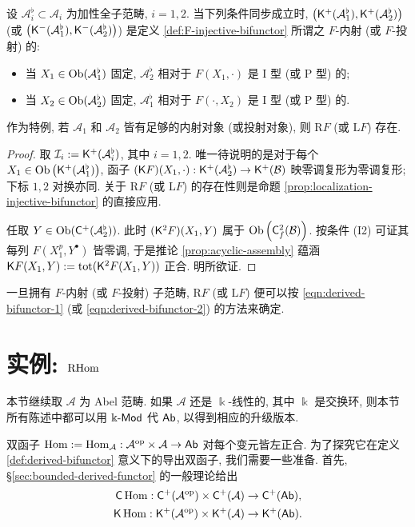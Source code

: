 \begin{lemma}\label{prop:RF-bifunctor}
	设 $\mathcal{A}_i^\flat \subset \mathcal{A}_i$ 为加性全子范畴, $i = 1, 2$. 当下列条件同步成立时, $\left(\mathsf{K}^+(\mathcal{A}_1^\flat), \mathsf{K}^+(\mathcal{A}_2^\flat) \right)$ (或 $\left(\mathsf{K}^-(\mathcal{A}_1^\flat), \mathsf{K}^-(\mathcal{A}_2^\flat) \right)$) 是定义 \ref{def:F-injective-bifunctor} 所谓之 $F$-内射 (或 $F$-投射) 的:
	\begin{itemize}
		\item 当 $X_1 \in \operatorname{Ob}(\mathcal{A}_1^\flat)$ 固定, $\mathcal{A}_2^\flat$ 相对于 $F(X_1, \cdot)$ 是 I 型 (或 P 型) 的;
		\item 当 $X_2 \in \operatorname{Ob}(\mathcal{A}_2^\flat)$ 固定, $\mathcal{A}_1^\flat$ 相对于 $F(\cdot, X_2)$ 是 I 型 (或 P 型) 的.
	\end{itemize}
	作为特例, 若 $\mathcal{A}_1$ 和 $\mathcal{A}_2$ 皆有足够的内射对象 (或投射对象), 则 $\mathrm{R}F$ (或 $\mathrm{L}F$) 存在.
\end{lemma}
\begin{proof}
	取 $\mathcal{I}_i := \mathsf{K}^+(\mathcal{A}_i^\flat)$, 其中 $i=1,2$. 唯一待说明的是对于每个 $X_1 \in \operatorname{Ob}\left(\mathsf{K}^+(\mathcal{A}^\flat_1)\right)$, 函子 $(\mathsf{K}F)(X_1, \cdot): \mathsf{K}^+(\mathcal{A}^\flat_2) \to \mathsf{K}^+(\mathcal{B})$ 映零调复形为零调复形; 下标 $1, 2$ 对换亦同. 关于 $\mathrm{R}F$ (或 $\mathrm{L}F$) 的存在性则是命题 \ref{prop:localization-injective-bifunctor} 的直接应用.
	
	任取 $Y \in \operatorname{Ob}(\mathsf{C}^+(\mathcal{A}^\flat_2))$. 此时 $(\mathsf{K}^2 F)(X_1, Y)$ 属于 $\operatorname{Ob}\left(\mathsf{C}^2_f(\mathcal{B})\right)$. 按条件 (I2) 可证其每列 $F(X_1^p, Y^\bullet)$ 皆零调, 于是推论 \ref{prop:acyclic-assembly} 蕴涵 $\mathsf{K}F(X_1, Y) := \operatorname{tot} (\mathsf{K}^2 F(X_1, Y))$ 正合. 明所欲证.
\end{proof}

一旦拥有 $F$-内射 (或 $F$-投射) 子范畴, $\mathrm{R}F$ (或 $\mathrm{L}F$) 便可以按 \eqref{eqn:derived-bifunctor-1} (或 \eqref{eqn:derived-bifunctor-2}) 的方法来确定.

\section{实例: \texorpdfstring{$\operatorname{RHom}$}{RHom}}\label{sec:RHom}
本节继续取 $\mathcal{A}$ 为 Abel 范畴. 如果 $\mathcal{A}$ 还是 $\Bbbk$-线性的, 其中 $\Bbbk$ 是交换环, 则本节所有陈述中都可以用 $\Bbbk\text{-}\mathsf{Mod}$ 代 $\mathsf{Ab}$, 以得到相应的升级版本.

双函子 $\operatorname{Hom} := \operatorname{Hom}_{\mathcal{A}}: \mathcal{A}^{\operatorname{op}} \times \mathcal{A} \to \mathsf{Ab}$ 对每个变元皆左正合. 为了探究它在定义 \ref{def:derived-bifunctor} 意义下的导出双函子, 我们需要一些准备. 首先, \S\ref{sec:bounded-derived-functor} 的一般理论给出
\begin{align*}
	\mathsf{C}\operatorname{Hom}: \mathsf{C}^+(\mathcal{A}^{\operatorname{op}}) \times \mathsf{C}^+(\mathcal{A}) & \to \mathsf{C}^+(\mathsf{Ab}), \\
	\mathsf{K}\operatorname{Hom}: \mathsf{K}^+(\mathcal{A}^{\operatorname{op}}) \times \mathsf{K}^+(\mathcal{A}) & \to \mathsf{K}^+(\mathsf{Ab}).
\end{align*}

